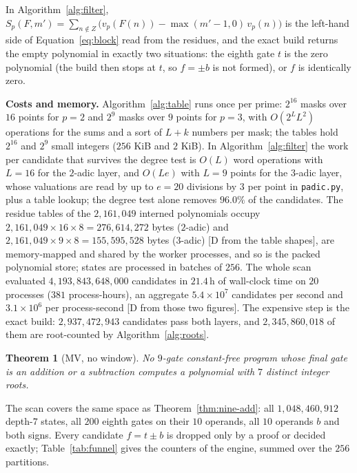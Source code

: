 \documentclass[11pt]{article}
\newtheorem{theorem}{Theorem}[section]
\theoremstyle{definition}
\theoremstyle{remark}
\begin{document}
In Algorithm~\ref{alg:filter}, $S_p(F, m') = \sum_{n \notin Z} \bigl( v_p(F(n)) - \max(m'-1,0)\,v_p(n) \bigr)$ is the left-hand side of Equation~\eqref{eq:block} read from the residues, and the exact build returns the empty polynomial in exactly two situations: the eighth gate $t$ is the zero polynomial (the build then stops at $t$, so $f = \pm b$ is not formed), or $f$ is identically zero.

\textbf{Costs and memory.} Algorithm~\ref{alg:table} runs once per prime: $2^{16}$ masks over $16$ points for $p = 2$ and $2^{9}$ masks over $9$ points for $p = 3$, with $O(2^L L^2)$ operations for the sums and a sort of $L + k$ numbers per mask; the tables hold $2^{16}$ and $2^{9}$ small integers ($256$ KiB and $2$ KiB). In Algorithm~\ref{alg:filter} the work per candidate that survives the degree test is $O(L)$ word operations with $L = 16$ for the $2$-adic layer, and $O(Le)$ with $L = 9$ points for the $3$-adic layer, whose valuations are read by up to $e = 20$ divisions by $3$ per point in \texttt{padic.py}, plus a table lookup; the degree test alone removes $96.0\%$ of the candidates. The residue tables of the $2{,}161{,}049$ interned polynomials occupy $2{,}161{,}049 \times 16 \times 8 = 276{,}614{,}272$ bytes ($2$-adic) and $2{,}161{,}049 \times 9 \times 8 = 155{,}595{,}528$ bytes ($3$-adic) [D from the table shapes], are memory-mapped and shared by the worker processes, and so is the packed polynomial store; states are processed in batches of $256$. The whole scan evaluated $4{,}193{,}843{,}648{,}000$ candidates in $21.4$\,h of wall-clock time on $20$ processes ($381$ process-hours), an aggregate $5.4 \times 10^{7}$ candidates per second and $3.1 \times 10^{6}$ per process-second [D from those two figures]. The expensive step is the exact build: $2{,}937{,}472{,}943$ candidates pass both layers, and $2{,}345{,}860{,}018$ of them are root-counted by Algorithm~\ref{alg:roots}.

\begin{theorem}[MV, no window]\label{thm:nine-add-free}
No $9$-gate constant-free program whose final gate is an addition or a subtraction
computes a polynomial with $7$ distinct integer roots.
\end{theorem}

The scan covers the same space as Theorem~\ref{thm:nine-add}: all
$1{,}048{,}460{,}912$ depth-$7$ states, all $200$ eighth gates on their $10$
operands, all $10$ operands $b$ and both signs. Every candidate $f = t \pm b$ is
dropped only by a proof or decided exactly; Table~\ref{tab:funnel} gives the counters of the
engine, summed over the $256$ partitions.
\end{document}
